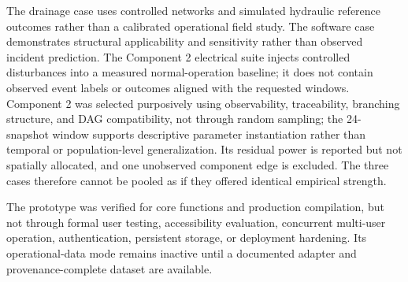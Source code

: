 The drainage case uses controlled networks and simulated hydraulic
reference outcomes rather than a calibrated operational field study.
The software case demonstrates structural applicability and sensitivity
rather than observed incident prediction. The Component 2 electrical
suite injects controlled disturbances into a measured normal-operation
baseline; it does not contain observed event labels or outcomes aligned
with the requested windows. Component 2 was selected purposively using
observability, traceability, branching structure, and DAG compatibility,
not through random sampling; the 24-snapshot window supports descriptive
parameter instantiation rather than temporal or population-level
generalization. Its residual power is reported but not spatially
allocated, and one unobserved component edge is excluded. The three cases
therefore cannot be pooled as if they offered identical empirical
strength.

The prototype was verified for core functions and production compilation,
but not through formal user testing, accessibility evaluation, concurrent
multi-user operation, authentication, persistent storage, or deployment
hardening. Its operational-data mode remains inactive until a documented
adapter and provenance-complete dataset are available.
